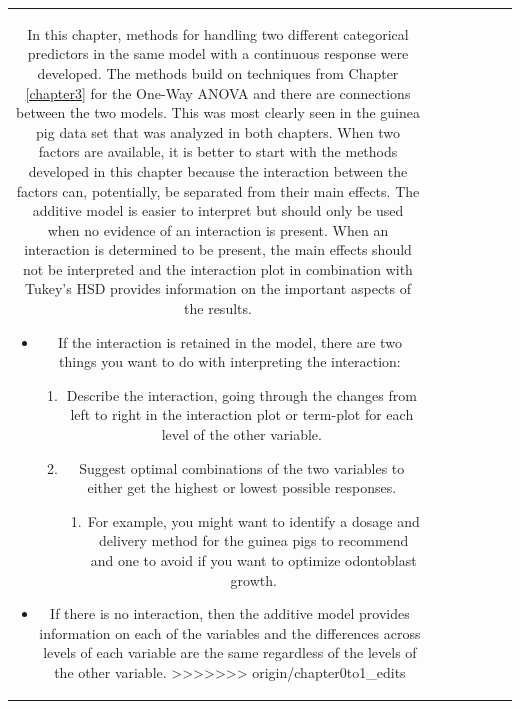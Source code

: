 \documentclass[]{book}
\newenvironment{Shaded}{\begin{snugshade}}{\end{snugshade}}
\providecommand{\tightlist}{%
  \setlength{\itemsep}{0pt}\setlength{\parskip}{0pt}}
\theoremstyle{definition}
\theoremstyle{definition}
\theoremstyle{remark}
\begin{document}
\begin{longtable}[]{@{}ccccccc@{}}
\begin{minipage}[b]{0.10\columnwidth}
\begin{Shaded}
\begin{Highlighting}[]
\begin{Shaded}
\begin{Highlighting}[]
\begin{Shaded}
\begin{Highlighting}[]
\begin{Shaded}
\begin{Highlighting}[]
\begin{Shaded}
\begin{Highlighting}[]
\begin{Shaded}
\begin{Highlighting}[]
\begin{Shaded}
\begin{Highlighting}[]
\begin{itemize}
In this chapter, methods for handling two different categorical
predictors in the same model with a continuous response were developed.
The methods build on techniques from Chapter \ref{chapter3} for the
One-Way ANOVA and there are connections between the two models. This was
most clearly seen in the guinea pig data set that was analyzed in both
chapters. When two factors are available, it is better to start with the
methods developed in this chapter because the interaction between the
factors can, potentially, be separated from their main effects. The
additive model is easier to interpret but should only be used when no
evidence of an interaction is present. When an interaction is determined
to be present, the main effects should not be interpreted and the
interaction plot in combination with Tukey's HSD provides information on
the important aspects of the results.

\begin{itemize}
\item
  If the interaction is retained in the model, there are two things you
  want to do with interpreting the interaction:

  \begin{enumerate}
  \def\labelenumi{\arabic{enumi}.}
  \item
    Describe the interaction, going through the changes from left to
    right in the interaction plot or term-plot for each level of the
    other variable.
  \item
    Suggest optimal combinations of the two variables to either get the
    highest or lowest possible responses.

    \begin{enumerate}
    \def\labelenumii{\alph{enumii}.}
    \tightlist
    \item
      For example, you might want to identify a dosage and delivery
      method for the guinea pigs to recommend and one to avoid if you
      want to optimize odontoblast growth.
    \end{enumerate}
  \end{enumerate}
\item
  If there is no interaction, then the additive model provides
  information on each of the variables and the differences across levels
  of each variable are the same regardless of the levels of the other
  variable.
>>>>>>> origin/chapter0to1_edits


\end{itemize}
\end{itemize}
\end{Highlighting}
\end{Shaded}
\end{Highlighting}
\end{Shaded}
\end{Highlighting}
\end{Shaded}
\end{Highlighting}
\end{Shaded}
\end{Highlighting}
\end{Shaded}
\end{Highlighting}
\end{Shaded}
\end{Highlighting}
\end{Shaded}
\end{minipage}
\end{longtable}
\end{document}
